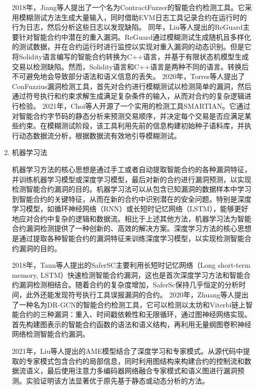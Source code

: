 \begin{enumerate}[label=\Alph*., align=left, leftmargin=*]
    2018年，Jiang等人提出了一个名为ContractFuzzer\cite{jiang2018contractfuzzer}的智能合约检测工具。它采用模糊测试方法生成大量输入，同时借助EVM日志工具记录合约在运行时的行为日志，然后分析这些日志以发现缺陷。
    同年，Liu等人提出的ReGuard\cite{reguard}主要针对智能合约中潜在的重入漏洞。ReGuard通过模糊测试生成随机且多样化的测试数据，并在合约运行时进行监控以实现对重入漏洞的动态识别。但是它将Solidity语言编写的智能合约转换为C++语言，并基于有限状态机模型生成交易以检测缺陷。然而，Solidity语言和C++语言是两种不同的语言。转换后不可避免地会导致部分语法和语义信息的丢失。
    2020年，Torres等人提出了ConFuzzius\cite{confuzzius}漏洞检测工具，首先对合约进行模糊测试以检测简单的漏洞，然后通过符号执行和约束求解生成满足复杂条件的输入，从而对合约的复杂逻辑进行检验。
    2021年，Choi等人开源了一个实用的检测工具SMARTIAN\cite{smartian}。它通过对智能合约字节码的静态分析来预测交易顺序，并决定每个交易是否应满足某些约束。在模糊测试阶段，该工具利用先前的信息构建初始种子语料库，并执行动态数据流分析，根据数据流有效地引导模糊测试。

    
    \item 机器学习法
    
    机器学习方法的核心思想是通过手工或者自动提取智能合约的各种漏洞特征，并训练机器学习模型或深度学习模型，最后对新的合约进行漏洞预测，以实现检测智能合约漏洞的目的。机器学习法可以从包含已知漏洞的数据样本中学习到智能合约的关键特征，从而在新的合约中识别潜在的安全问题。特别是深度学习模型，如循环神经网络（RNN）或长短时记忆网络（LSTM），能够更好地应对合约中复杂的逻辑和数据流。相比于上述其他方法，机器学习法为智能合约漏洞检测提供了一种创新的、高效的解决方案。深度学习方法的核心思想是通过提取各种智能合约的漏洞特征来训练深度学习模型，以实现检测智能合约漏洞的目的。

    2018年，Tann等人提出的SaferSC\cite{tann2018towards}主要利用长短时记忆网络（Long short-term memory, LSTM）快速检测智能合约漏洞，这也是首次深度学习方法和智能合约漏洞检测相结合。随着合约的复杂度增加，SaferSc保持几乎恒定的分析时间，此外还能发现符号执行工具误报漏洞的合约。
    2020年，Zhuang等人提出了一种名为DR-GCN\cite{zhuang2021smart}的智能合约检测工具，它可以检测以太坊和Viterbi链上智能合约的三种漏洞：重入、时间戳依赖性和无限循环，通过图神经网络实现。首先构建图表示的智能合约函数的语法和语义结构，再利用无量纲图卷积神经网络检测智能合约漏洞。
    
    2021年，Liu等人提出的AME\cite{liu2021smart}模型结合了深度学习和专家模式。从源代码中提取的专家模式包含合约的局部信息，同时利用图结构来构建合约的控制流和数据流语义，最后使用注意力多编码器网络融合专家模式和语义图进行漏洞预测。实验证明该方法显著优于原先基于静态或动态分析的方法。
\end{enumerate}

